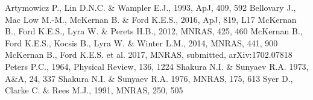 \documentclass{mnras}
\begin{document}
\begin{thebibliography}{99}
 Artymowicz P., Lin D.N.C. \& Wampler E.J., 1993, ApJ, 409, 592
 Bellovary J., Mac Low M.-M., McKernan B. \& Ford K.E.S., 2016, ApJ, 819, L17
 McKernan B., Ford K.E.S., Lyra W. \& Perets H.B., 2012, MNRAS, 425, 460
 McKernan B., Ford K.E.S., Kocsis B., Lyra W. \& Winter L.M., 2014, MNRAS, 441, 900
 McKernan B., Ford K.E.S. et al. 2017, MNRAS, submitted, arXiv:1702.07818
 Peters P.C., 1964, Physical Review, 136, 1224 
 Shakura N.I. \& Sunyaev R.A. 1973, A\&A, 24, 337 
 Shakura N.I. \& Sunyaev R.A. 1976, MNRAS, 175, 613 
 Syer D., Clarke C. \& Rees M.J., 1991, MNRAS, 250, 505 

\end{thebibliography}
\end{document}
